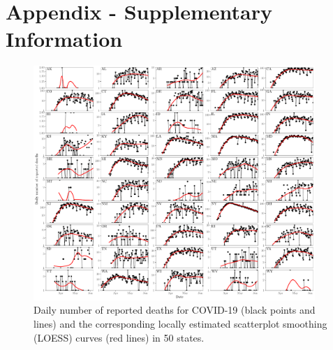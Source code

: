 \renewcommand{\thefigure}{S\arabic{figure}}
\setcounter{figure}{0}

\section{Appendix - Supplementary Information}

\begin{figure}[t!]
\begin{center}
\includegraphics[width=0.95\textwidth]{deaths/deaths.pdf}
\caption{Daily number of reported deaths for COVID-19 (black points and lines) and the corresponding locally estimated scatterplot smoothing (LOESS) curves (red lines) in 50 states.
\label{fig.supp_plateaus}}
\end{center}
\end{figure}

